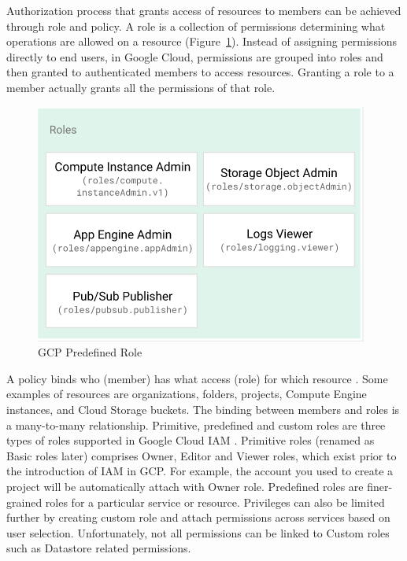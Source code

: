 \documentclass[a4paper,twoside]{article}
\begin{document}
Authorization process that grants access of resources to members can be achieved through role and policy. A role is a collection of permissions determining what operations are allowed on a resource (Figure~\ref{fig:role}). Instead of assigning permissions directly to end users, in Google Cloud, permissions are grouped into roles and then granted to authenticated members to access resources. Granting a role to a member actually grants all the permissions of that role.
\begin{figure}[!h]
  \centering
  \includegraphics[width=\linewidth]{pic/role}
  \caption {GCP Predefined Role}
  \label{fig:role}
\end{figure}
A policy binds who (member) has what access (role) for which resource \cite{Googlecloudiam}. Some examples of resources are organizations, folders, projects, Compute Engine instances, and Cloud Storage buckets. The binding between members and roles is a many-to-many relationship.
Primitive, predefined and custom roles are three types of roles supported in Google Cloud IAM \cite{googlecloudrole}. Primitive roles (renamed as Basic roles later) comprises Owner, Editor and Viewer roles, which exist prior to the introduction of IAM in GCP. For example, the account you used to create a project will be automatically attach with Owner role. Predefined roles are finer-grained roles for a particular service or resource. Privileges can also be limited further by creating custom role and attach permissions across services based on user selection. Unfortunately, not all permissions can be linked to Custom roles such as Datastore related permissions. 
\end{document}
